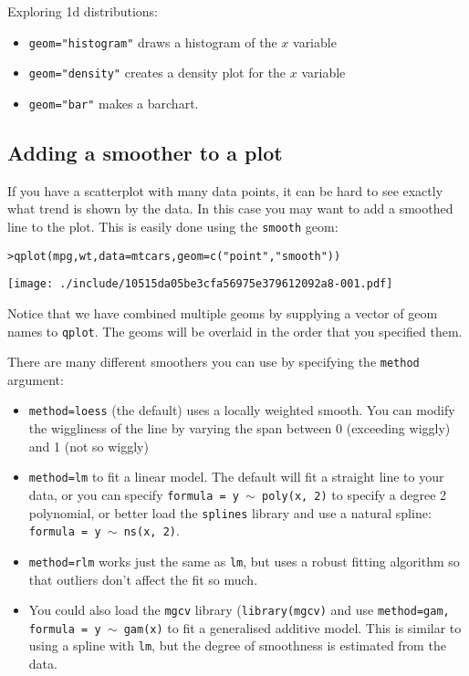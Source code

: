 Exploring 1d distributions:

\begin{itemize}
	\item {\tt geom="histogram"} draws a histogram of the $x$ variable
	\item {\tt geom="density"} creates a density plot for the $x$ variable
	\item {\tt geom="bar"} makes a barchart.
\end{itemize}

\subsection{Adding a smoother to a plot}\label{sub:smooth}

If you have a scatterplot with many data points, it can be hard to see exactly what trend is shown by the data.  In this case you may want to add a smoothed line to the plot.  This is easily done using the {\tt smooth} geom:

\begin{alltt}
> qplot(mpg, wt, data = mtcars, geom = c("point", "smooth"))
\end{alltt}
\texttt{[image: ./include/10515da05be3cfa56975e379612092a8-001.pdf]}
\begin{alltt}

\end{alltt}

Notice that we have combined multiple geoms by supplying a vector of geom names to {\tt qplot}.  The geoms will be overlaid in the order that you specified them.

There are many different smoothers you can use by specifying the {\tt method} argument:

\begin{itemize}
	\item {\tt method=loess} (the default) uses a locally weighted smooth.  You can modify the wiggliness of the line by varying the span between 0 (exceeding wiggly) and 1 (not so wiggly)

	\item {\tt method=lm} to fit a linear model.  The default will fit a straight line to your data, or you can specify {\tt formula = y $\sim$ poly(x, 2)} to specify a degree 2 polynomial, or better load the {\tt splines} library and use a natural spline: {\tt formula = y $\sim$ ns(x, 2)}.

	\item {\tt method=rlm} works just the same as {\tt lm}, but uses a robust fitting algorithm so that outliers don't affect the fit so much.

	\item You could also load the {\tt mgcv} library ({\tt library(mgcv)} and use {\tt method=gam, formula = y $\sim$ gam(x)} to fit a generalised additive model.  This is similar to using a spline with {\tt lm}, but the degree of smoothness is estimated from the data.
\end{itemize}

